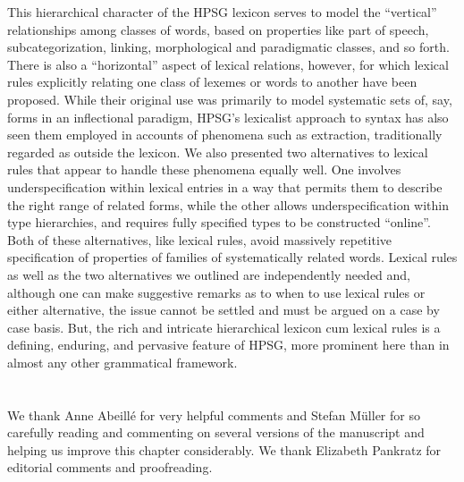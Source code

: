 \documentclass[output=paper,biblatex,babelshorthands,newtxmath,draftmode,colorlinks,citecolor=brown]{langscibook}
\begin{document}
This hierarchical character of the HPSG lexicon serves to model the ``vertical'' relationships among classes of words, based on properties like part of speech, subcategorization, linking, morphological and paradigmatic classes, and so forth.
There is also a ``horizontal'' aspect of lexical relations, however, for which lexical rules explicitly relating one class of lexemes or words to another have been proposed.
While their original use was primarily to model systematic sets of, say, forms in an inflectional paradigm, HPSG's lexicalist approach to syntax has also seen them employed in accounts of phenomena such as extraction, traditionally regarded as outside the lexicon.
We also presented two alternatives to lexical rules that appear to handle these phenomena equally well.
One involves underspecification within lexical entries in a way that permits them to describe the right range of related forms, while the other allows underspecification within type hierarchies, and requires fully specified types to be constructed ``online''.
Both of these alternatives, like lexical rules, avoid massively repetitive specification of properties of families of systematically related words. Lexical rules as well as the two alternatives we outlined are independently needed and, although one can make suggestive remarks as to when to use lexical rules or either alternative, the issue cannot be settled  and must be argued on a case by case basis. But, the rich and intricate hierarchical lexicon cum lexical rules is a defining, enduring, and pervasive feature of HPSG, more prominent here than in almost any other grammatical framework.%




 
\section*{\acknowledgmentsUS}

We thank Anne Abeillé for very helpful comments and Stefan Müller for so carefully reading and commenting on several versions of the manuscript  and helping us improve this chapter considerably. We thank Elizabeth Pankratz for editorial comments and proofreading.

{\sloppy
\printbibliography[heading=subbibliography,notkeyword=this] 
}
\end{document}

